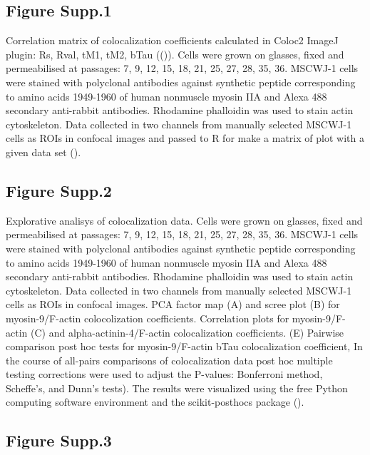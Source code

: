 \documentclass[num-refs]{wiley-article}
\begin{document}
\subsection*{Figure Supp.1}

Correlation matrix of colocalization coefficients calculated in Coloc2 ImageJ plugin: Rs, Rval, tM1, tM2, bTau ((\cite{rueden2017imagej2})).
Cells were grown on glasses, fixed and permeabilised at passages: 7, 9, 12, 15, 18, 21, 25, 27, 28, 35, 36. MSCWJ-1 cells were stained with polyclonal antibodies against synthetic peptide corresponding to amino acids 1949-1960 of human nonmuscle myosin IIA and Alexa 488 secondary anti-rabbit antibodies. Rhodamine phalloidin was used to stain actin cytoskeleton. Data collected in two channels from manually selected MSCWJ-1 cells as ROIs in confocal images and passed to R for make a matrix of plot with a given data set (\cite{emerson2013generalized}).

\subsection*{Figure Supp.2}

Explorative analisys of colocalization data. Cells were grown on glasses, fixed and permeabilised at passages: 7, 9, 12, 15, 18, 21, 25, 27, 28, 35, 36. MSCWJ-1 cells were stained with polyclonal antibodies against synthetic peptide corresponding to amino acids 1949-1960 of human nonmuscle myosin IIA and Alexa 488 secondary anti-rabbit antibodies. Rhodamine phalloidin was used to stain actin cytoskeleton. Data collected in two channels from manually selected MSCWJ-1 cells as ROIs in confocal images.
PCA factor map (A) and scree plot (B) for myosin-9/F-actin colocolization coefficients. Correlation plots for myosin-9/F-actin (C) and alpha-actinin-4/F-actin colocalization coefficients. (E) Pairwise comparison post hoc tests for myosin-9/F-actin bTau colocalization coefficient, In the course of all-pairs comparisons of colocalization data post hoc multiple testing corrections were used to adjust the P-values: Bonferroni method, Scheffe’s, and Dunn’s tests).
The results were visualized using the free Python computing software environment and the scikit-posthocs package (\cite{Terpilowski2019}).

\subsection*{Figure Supp.3}
\end{document}
